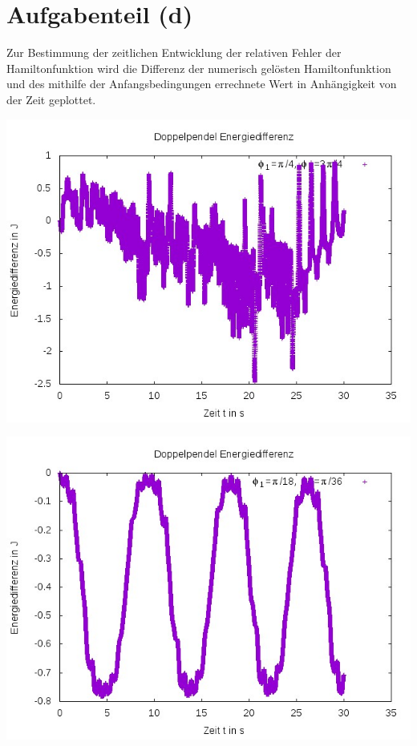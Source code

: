 \documentclass{scrreprt}
\begin{document}
\section*{Aufgabenteil (d)}
Zur Bestimmung der zeitlichen Entwicklung der relativen Fehler der Hamiltonfunktion wird die Differenz der numerisch gelösten Hamiltonfunktion und des mithilfe der Anfangsbedingungen errechnete Wert in Anhängigkeit von der Zeit geplottet.

\begin{center}
	\includegraphics[scale=0.7]{1ae.jpeg}
\end{center}

\begin{center}
	\includegraphics[scale=0.7]{1be.jpg}
\end{center}
\end{document}
